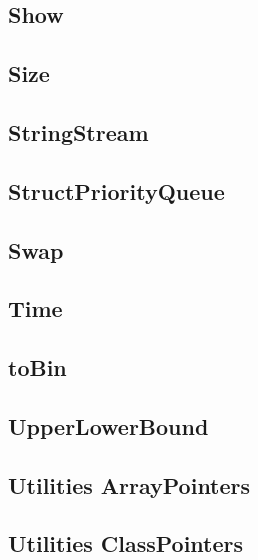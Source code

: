 \subsection{ Show}
\raggedbottom
\hrulefill
\subsection{ Size}
\raggedbottom
\hrulefill
\subsection{ StringStream}
\raggedbottom
\hrulefill
\subsection{ StructPriorityQueue}
\raggedbottom
\hrulefill
\subsection{ Swap}
\raggedbottom
\hrulefill
\subsection{ Time}
\raggedbottom
\hrulefill
\subsection{ toBin}
\raggedbottom
\hrulefill
\subsection{ UpperLowerBound}
\raggedbottom
\hrulefill
\subsection{Utilities ArrayPointers}
\raggedbottom
\hrulefill
\subsection{Utilities ClassPointers}
\raggedbottom
\hrulefill
